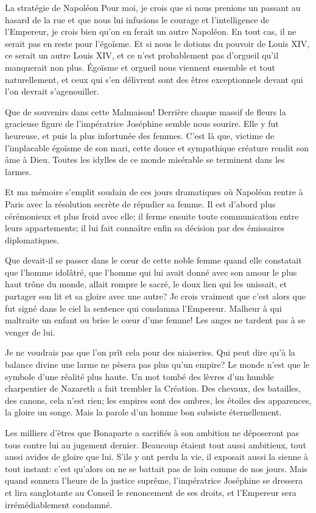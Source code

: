 \begin{chapter}{La stratégie de Napoléon}
Pour moi, je crois que si nous prenions un passant au hasard de la rue
et que nous lui infusions le courage et l'intelligence de l'Empereur, je
crois bien qu'on en ferait un autre Napoléon. En tout cas, il ne serait
pas en reste pour l'égoïsme. Et si nous le dotions du pouvoir de Louis
XIV, ce serait un autre Louis XIV, et ce n'est probablement pas
d'orgueil qu'il manquerait non plus. Égoïsme et orgueil nous viennent
ensemble et tout naturellement, et ceux qui s'en délivrent sont des
êtres exceptionnels devant qui l'on devrait s'agenouiller.

Que de souvenirs dans cette Malmaison! Derrière chaque massif de fleurs
la gracieuse figure de l'impératrice Joséphine semble nous sourire.
Elle y fut heureuse, et puis la plus infortunée des femmes. C'est là
que, victime de l'implacable égoïsme de son mari, cette douce et
sympathique créature rendit son âme à Dieu. Toutes les idylles de ce
monde misérable se terminent dans les larmes.

Et ma mémoire s'emplit soudain de ces jours dramatiques où Napoléon
rentre à Paris avec la résolution secrète de répudier sa femme. Il est
d'abord plus cérémonieux et plus froid avec elle; il ferme ensuite toute
communication entre leurs appartements; il lui fait connaître enfin sa
décision par des émissaires diplomatiques.

Que devait-il se passer dans le cœur de cette noble femme quand elle
constatait que l'homme idolâtré, que l'homme qui lui avait donné avec
son amour le plus haut trône du monde, allait rompre le sacré, le doux
lien qui les unissait, et partager son lit et sa gloire avec une autre?
Je crois vraiment que c'est alors que fut signé dans le ciel la sentence
qui condamna l'Empereur. Malheur à qui maltraite un enfant ou brise le
cœur d'une femme! Les anges ne tardent pas à se venger de lui.

Je ne voudrais pas que l'on prît cela pour des niaiseries. Qui peut dire
qu'à la balance divine une larme ne pèsera pas plus qu'un empire? Le
monde n'est que le symbole d'une réalité plus haute. Un mot tombé des
lèvres d'un humble charpentier de Nazareth a fait trembler la Création.
Des chevaux, des batailles, des canons, cela n'est rien; les empires
sont des ombres, les étoiles des apparences, la gloire un songe. Mais la
parole d'un homme bon subsiste éternellement.

Les milliers d'êtres que Bonaparte a sacrifiés à son ambition ne
déposeront pas tous contre lui au jugement dernier. Beaucoup étaient
tout aussi ambitieux, tout aussi avides de gloire que lui. S'ils y ont
perdu la vie, il exposait aussi la sienne à tout instant: c'est qu'alors
on ne se battait pas de loin comme de nos jours. Mais quand sonnera
l'heure de la justice suprême, l'impératrice Joséphine se dressera et
lira sanglotante au Conseil le renoncement de ses droits, et l'Empereur
sera irrémédiablement condamné.


\end{chapter}
